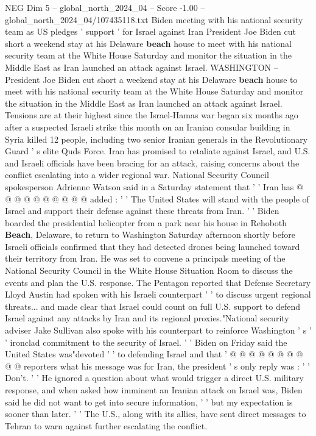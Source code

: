 \begin{textsample}{NEG Dim 5 – global\_north\_2024\_04 – Score -1.00 – global\_north\_2024\_04/107435118.txt}  \label{ex:f5_neg_195}
Biden meeting with his national security team as US pledges ' support ' for Israel against Iran President Joe Biden cut short a weekend stay at his Delaware \textbf{beach} house to meet with his national security team at the White House Saturday and monitor the situation in the Middle East as Iran launched an attack against Israel.
WASHINGTON -- President Joe Biden cut short a weekend stay at his Delaware \textbf{beach} house to meet with his national security team at the White House Saturday and monitor the situation in the Middle East as Iran launched an attack against Israel.
Tensions are at their highest since the Israel-Hamas war began six months ago after a suspected Israeli strike this month on an Iranian consular building in Syria killed 12 people, including two senior Iranian generals in the Revolutionary Guard ' s elite Quds Force.
Iran has promised to retaliate against Israel, and U.S. and Israeli officials have been bracing for an attack, raising concerns about the conflict escalating into a wider regional war.
National Security Council spokesperson Adrienne Watson said in a Saturday statement that ' ' Iran has @ @ @ @ @ @ @ @ @ @ added : ' ' The United States will stand with the people of Israel and support their defense against these threats from Iran. ' ' Biden boarded the presidential helicopter from a park near his house in Rehoboth \textbf{Beach}, Delaware, to return to Washington Saturday afternoon shortly before Israeli officials confirmed that they had detected drones being launched toward their territory from Iran.
He was set to convene a principals meeting of the National Security Council in the White House Situation Room to discuss the events and plan the U.S. response.
The Pentagon reported that Defense Secretary Lloyd Austin had spoken with his Israeli counterpart ' ' to discuss urgent regional threats... and made clear that Israel could count on full U.S. support to defend Israel against any attacks by Iran and its regional proxies."National security adviser Jake Sullivan also spoke with his counterpart to reinforce Washington ' s ' ' ironclad commitment to the security of Israel. ' ' Biden on Friday said the United States was"devoted ' ' to defending Israel and that ' @ @ @ @ @ @ @ @ @ @ reporters what his message was for Iran, the president ' s only reply was : ' ' Don't. ' ' He ignored a question about what would trigger a direct U.S. military response, and when asked how imminent an Iranian attack on Israel was, Biden said he did not want to get into secure information, ' ' but my expectation is sooner than later. ' ' The U.S., along with its allies, have sent direct messages to Tehran to warn against further escalating the conflict.

\end{textsample}
